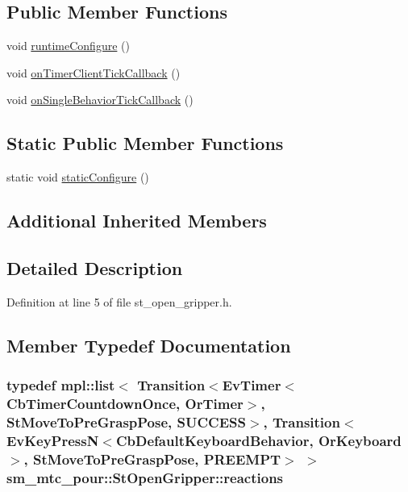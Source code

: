 \subsection*{Public Member Functions}
\begin{DoxyCompactItemize}
\item 
void \hyperlink{structsm__mtc__pour_1_1StOpenGripper_a822ac318b2e9372f5213583181b31f80}{runtime\+Configure} ()
\item 
void \hyperlink{structsm__mtc__pour_1_1StOpenGripper_adbe306e18f8241558af0c0eec4d62168}{on\+Timer\+Client\+Tick\+Callback} ()
\item 
void \hyperlink{structsm__mtc__pour_1_1StOpenGripper_a789d83bcc66eb7da114c03a13a1961df}{on\+Single\+Behavior\+Tick\+Callback} ()
\end{DoxyCompactItemize}
\subsection*{Static Public Member Functions}
\begin{DoxyCompactItemize}
\item 
static void \hyperlink{structsm__mtc__pour_1_1StOpenGripper_a7c1074f8e5e98829aa137f72fc8633b2}{static\+Configure} ()
\end{DoxyCompactItemize}
\subsection*{Additional Inherited Members}


\subsection{Detailed Description}


Definition at line 5 of file st\+\_\+open\+\_\+gripper.\+h.



\subsection{Member Typedef Documentation}
\subsubsection[{\texorpdfstring{reactions}{reactions}}]{\setlength{\rightskip}{0pt plus 5cm}typedef mpl\+::list$<$ Transition$<$Ev\+Timer$<$Cb\+Timer\+Countdown\+Once, {\bf Or\+Timer}$>$, {\bf St\+Move\+To\+Pre\+Grasp\+Pose}, {\bf S\+U\+C\+C\+E\+SS}$>$, Transition$<$Ev\+Key\+PressN$<$Cb\+Default\+Keyboard\+Behavior, {\bf Or\+Keyboard}$>$, {\bf St\+Move\+To\+Pre\+Grasp\+Pose}, {\bf P\+R\+E\+E\+M\+PT}$>$ $>$ {\bf sm\+\_\+mtc\+\_\+pour\+::\+St\+Open\+Gripper\+::reactions}}\hypertarget{structsm__mtc__pour_1_1StOpenGripper_a266653b0981abb6733b2aa08b4d343ad}{}\label{structsm__mtc__pour_1_1StOpenGripper_a266653b0981abb6733b2aa08b4d343ad}


